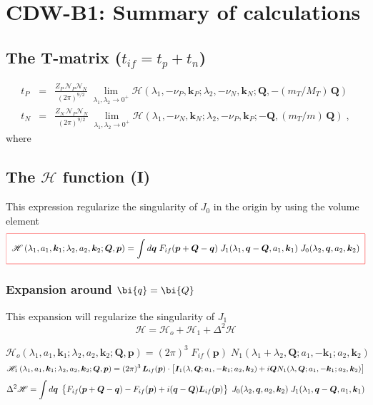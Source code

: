 \chapter{CDW-B1: Summary of calculations}

\section*{The T-matrix ($t_{if} = t_{p} + t_{n}$)}

\begin{eqnarray}\label{QR:T}%
t_{P} &=& \frac{Z_{P}\, \mathcal{N}_{P} \mathcal{N}_{N}}{(2\pi)^{9/2}}
\; \lim_{\lambda_{1},\lambda_{2} \to 0^{+}} \mathcal{H} \left(
\lambda_{1},- \nu_{P},\bm{k}_{P} ;  \lambda_{2},-
\nu_{N},\bm{k}_{N};\bm{Q} , -(m_{T}/M_{T}) \, \bm{Q} \right)
  \nonumber \\
t_{N} &=& \frac{Z_{N} \, \mathcal{N}_{P} \mathcal{N}_{N}}{(2\pi)^{9/2}}
\; \lim_{\lambda_{1},\lambda_{2} \to 0^{+}} \mathcal{H} \left(
\lambda_{1}, - \nu_{N},\bm{k}_{N} ; \lambda_{2},- \nu_{P},\bm{k}_{P} ;
- \bm{Q} ,  (m_{T}/m) \, \bm{Q} \right) \; ,
\end{eqnarray}
%
where
%
\section{The $\mathcal{H}$ function (I)}
This expression regularize the singularity of $J_{0}$ in the origin by
using the volume element
%
\begin{equation}\label{Q:Ha}%
  \fbeq{
 \mathcal{H} \left( \lambda_{1},a_{1},\bm{k}_{1} ;
  \lambda_{2},a_{2},\bm{k}_{2}; \bm{Q}, \bm{p} \right)  =
 \int d \bm{q} \; F_{if}( \bm{p} + \bm{Q} - \bm{q} ) \;
 J_{1}( \lambda_{1}, \bm{q} - \bm{Q}, a_{1}, \bm{k}_{1} )\;
J_{0}( \lambda_{2}, \bm{q} , a_{2}, \bm{k}_{2} )
  }
\end{equation}

\subsection{Expansion around $\bi{q} = \bi{Q}$} 

This expansion will regularize the singularity of $J_{1}$
%
\[
\mathcal{H} = \mathcal{H}_{o} + \mathcal{H}_{1} + \Delta^{2}
\mathcal{H}
\]

\begin{equation}\label{Q:Hb}
\mathcal{H}_{o} \left( \lambda_{1},a_{1},\bm{k}_{1} ; \lambda_{2},
a_{2}, \bm{k}_{2} ; \bm{Q}, \bm{p} \right) = (2 \pi)^{3} \;
F_{if}(\bm{p}) \; N_{1} \left(\lambda_{1}+\lambda_{2}, \bm{Q} ; a_{1},
- \bm{k}_{1} ; a_{2}, \bm{k}_{2} \right)
\end{equation}
%
\[
\mathcal{H}_{1}\left( \lambda_{1},a_{1},\bm{k}_{1} ; \lambda_{2},
a_{2}, \bm{k}_{2}; \bm{Q}, \bm{p} \right)= (2 \pi)^{3} \, \bm{L}_{if}
(\bm{p}) \cdot  \left[ \bm{I}_{1}(\lambda,\bm{Q}; a_{1}, -\bm{k}_{1};
a_{2}, \bm{k}_{2} ) + i \bm{Q} N_{1}(\lambda,\bm{Q} ;
a_{1},-\bm{k}_{1} ; a_{2},\bm{k}_{2}) \vstretch \right]
\]
%
\[
\Delta^{2} \mathcal{H} = \int d \bm{q} \; \left\{ F_{if}( \bm{p} +
\bm{Q} - \bm{q} ) - F_{if}(\bm{p}) + i (\bm{q}-\bm{Q})
\bm{L}_{if}(\bm{p}) \vstretch\right\} \;
 J_{0}( \lambda_{2}, \bm{q} , a_{2}, \bm{k}_{2} ) \;
 J_{1}( \lambda_{1}, \bm{q} - \bm{Q}, a_{1}, \bm{k}_{1} )
\]

